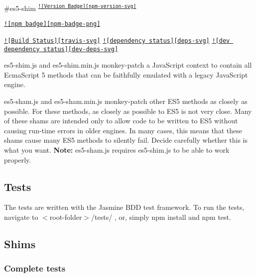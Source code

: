 \#es5-\/shim \textsuperscript{\href{https://npmjs.org/package/es5-shim}{\tt !\mbox{[}Version Badge\mbox{]}\mbox{[}npm-\/version-\/svg\mbox{]}}}

\href{https://npmjs.org/package/es5-shim}{\tt !\mbox{[}npm badge\mbox{]}\mbox{[}npm-\/badge-\/png\mbox{]}}

\href{https://travis-ci.org/es-shims/es5-shim}{\tt !\mbox{[}Build Status\mbox{]}\mbox{[}travis-\/svg\mbox{]}} \href{https://david-dm.org/es-shims/es5-shim}{\tt !\mbox{[}dependency status\mbox{]}\mbox{[}deps-\/svg\mbox{]}} \href{https://david-dm.org/es-shims/es5-shim#info=devDependencies}{\tt !\mbox{[}dev dependency status\mbox{]}\mbox{[}dev-\/deps-\/svg\mbox{]}}

{\ttfamily es5-\/shim.\+js} and {\ttfamily es5-\/shim.\+min.\+js} monkey-\/patch a Java\+Script context to contain all Ecma\+Script 5 methods that can be faithfully emulated with a legacy Java\+Script engine.

{\ttfamily es5-\/sham.\+js} and {\ttfamily es5-\/sham.\+min.\+js} monkey-\/patch other E\+S5 methods as closely as possible. For these methods, as closely as possible to E\+S5 is not very close. Many of these shams are intended only to allow code to be written to E\+S5 without causing run-\/time errors in older engines. In many cases, this means that these shams cause many E\+S5 methods to silently fail. Decide carefully whether this is what you want. {\bfseries Note\+:} {\ttfamily es5-\/sham.\+js} requires {\ttfamily es5-\/shim.\+js} to be able to work properly.

\subsection*{Tests}

The tests are written with the Jasmine B\+D\+D test framework. To run the tests, navigate to $<$root-\/folder$>$/tests/ , or, simply {\ttfamily npm install} and {\ttfamily npm test}.

\subsection*{Shims}

\subsubsection*{Complete tests}


